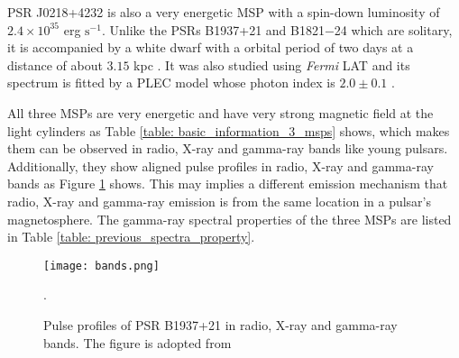 \documentclass[a4paper, 12pt]{report}
\begin{document}
    PSR J0218+4232 is also a very energetic MSP with a spin-down luminosity of $2.4\times
    10^{35}$ erg $\mbox{s}^{-1}$. Unlike the PSRs B1937+21 and B1821$-$24 which are solitary,
    it is accompanied by a white dwarf with a orbital period of two days at a distance of 
    about $3.15$ kpc \cite{article}. It was also studied using \textit{Fermi} LAT and 
    its spectrum is fitted by a PLEC model whose photon index is $2.0\pm0.1$ 
    \cite{0067-0049-208-2-17}.

    All three MSPs are very energetic and have very strong magnetic field at the light 
    cylinders as Table \ref{table: basic_information_3_msps} shows, which makes them can be 
    observed in radio, X-ray and gamma-ray bands like young pulsars. Additionally, they 
    show aligned pulse profiles in radio, X-ray and gamma-ray bands as Figure
    \ref{fig:class } shows. This may implies a different emission mechanism that radio,
    X-ray and gamma-ray emission is from the same location in a pulsar's magnetosphere. 
    The gamma-ray spectral properties of the three MSPs are listed in Table 
    \ref{table: previous_spectra_property}.  

    \begin{figure}[!htp]   
      \centering
      \texttt{[image: bands.png]}
      \caption{Pulse profiles of PSR B1937+21 in radio, X-ray and gamma-ray bands. 
        The figure is adopted from \cite{0004-637X-787-2-167}}.
      \label{fig:class }
    \end{figure}
    
    \begin{table}[!htp]
      \centering
      \centering
      \caption[Spin and derived properties of PSRs J0218+4232, B1821$-$24 and B1937+21.]
        {Spin and derived properties of PSRs J0218+4232, B1821$-$24 and B1937+21. 
        The data are from the ATNF Pulsar Catalogue \protect \footnotemark}
      \label{table: basic_information_3_msps}
    \end{table}
\end{document}
